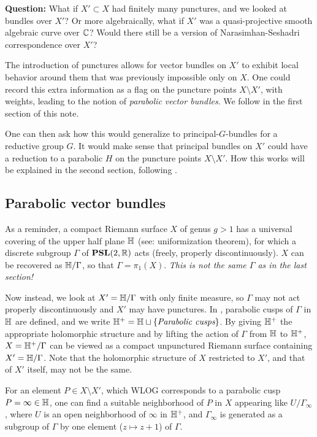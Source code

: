 \textbf{Question:} What if $X'\subset X$ had finitely many punctures, and we looked at bundles over $X'$? Or more algebraically, what if $X'$ was a quasi-projective smooth algebraic curve over $\mathbb{C}$? Would there still be a version of Narasimhan-Seshadri  correspondence over $X'$?

The introduction of punctures allows for vector bundles on $X'$ to exhibit local behavior around them that was previously impossible only on $X$. One could record this extra information as a flag on the puncture points $X\setminus X'$, with weights, leading to the notion of \textit{parabolic vector bundles}. We follow \cite{mehtasesh} in the first section of this note.

One can then ask how this would generalize to principal-$G$-bundles for a reductive group $G$. It would make sense that principal bundles on $X'$ could have a reduction to a parabolic $H$ on the puncture points $X\setminus X'$. How this works will be explained in the second section, following \cite{pr}.

\subsection{Parabolic vector bundles}

As a reminder, a compact Riemann surface $X$ of genus $g>1$ has a universal covering of the upper half plane $\mathbb{H}$ (see: uniformization theorem), for which a discrete subgroup $\Gamma$ of $\mathbf{PSL}(2,\mathbb{R})$ acts (freely, properly discontinuously). $X$ can be recovered as $\mathbb{H}/\Gamma$, so that $\Gamma=\pi_1(X)$. \textit{This is not the same $\Gamma$ as in the last section!}

Now instead, we look at $X'=\mathbb{H}/\Gamma$ with only finite measure, so $\Gamma$ may not act properly discontinuously and $X'$ may have punctures. In \cite{eom}, parabolic cusps of $\Gamma$ in $\mathbb{H}$ are defined, and we write $\mathbb{H}^+=\mathbb{H}\sqcup\{\textit{Parabolic cusps}\}$. By giving $\mathbb{H}^+$ the appropriate holomorphic structure and by lifting the action of $\Gamma$ from $\mathbb{H}$ to $\mathbb{H}^+$,
$X=\mathbb{H}^+/\Gamma$ can be viewed as a compact unpunctured Riemann surface containing $X'=\mathbb{H}/\Gamma$. Note that the holomorphic structure of $X$ restricted to $X'$, and that of $X'$ itself, may not be the same.

For an element $P\in X\setminus X'$, which WLOG corresponds to a parabolic cusp $P=\infty\in\mathbb{H}$, one can find a suitable neighborhood of $P$ in $X$ appearing like $U/\Gamma_\infty$, where $U$ is an open neighborhood of $\infty$ in $\mathbb{H}^+$, and $\Gamma_\infty$ is generated as a subgroup of $\Gamma$ by one element ($z\mapsto z+1$) of $\Gamma$.

